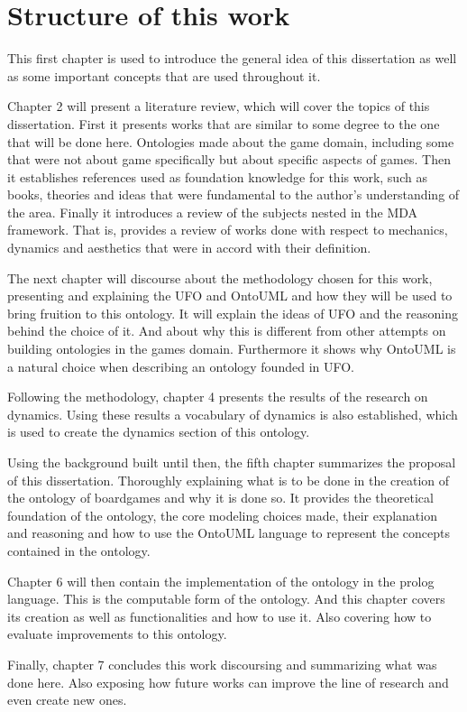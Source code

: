 \section{Structure of this work}

This first chapter is used to introduce the general idea of this dissertation as well as some important concepts that are used throughout it.

Chapter 2 will present a literature review, which will cover the topics of this dissertation. First it presents works that are similar to some degree to the one that will be done here. Ontologies made about the game domain, including some that were not about game specifically but about specific aspects of games. Then it establishes references used as foundation knowledge for this work, such as books, theories and ideas that were fundamental to the author's understanding of the area. Finally it introduces a review of the subjects nested in the MDA framework. That is, provides a review of works done with respect to mechanics, dynamics and aesthetics that were in accord with their definition.

The next chapter will discourse about the methodology chosen for this work, presenting and explaining the UFO and OntoUML and how they will be used to bring fruition to this ontology. It will explain the ideas of UFO and the reasoning behind the choice of it. And about why this is different from other attempts on building ontologies in the games domain. Furthermore it shows why OntoUML is a natural choice when describing an ontology founded in UFO. 

Following the methodology, chapter 4 presents the results of the research on dynamics. Using these results a vocabulary of dynamics is also established, which is used to create the dynamics section of this ontology.

Using the background built until then, the fifth chapter summarizes the proposal of this dissertation. Thoroughly explaining what is to be done in the creation of the ontology of boardgames and why 
it is done so. It provides the theoretical foundation of the ontology, the core modeling choices made, their explanation and reasoning and how to use the OntoUML language to represent the concepts contained in the ontology.

Chapter 6 will then contain the implementation of the ontology in the prolog language. This is the computable form of the ontology. And this chapter covers its creation as well as functionalities and how to use it. Also covering how to evaluate improvements to this ontology.

Finally, chapter 7 concludes this work discoursing and summarizing what was done here. Also exposing how future works can improve the line of research and even create new ones.

